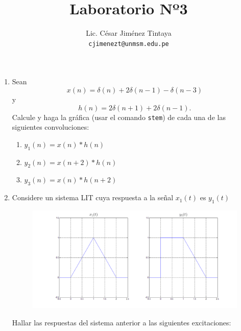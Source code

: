 \documentclass[a4paper,11pt,final]{article}
\begin{document}
    \title{Laboratorio Nº3}
    \author{Lic. César Jiménez Tintaya\\ \small{\texttt{cjimenezt@unmsm.edu.pe}}}
    \date{}
    \maketitle

    \begin{enumerate}
        \item Sean
        $$x\left(n\right) = \delta\left(n\right) + 2\delta\left(n-1\right) - \delta\left(n-3\right)$$
        y
        $$h\left(n\right) = 2\delta\left(n+1\right) + 2\delta\left(n-1\right).$$
        Calcule y haga la gráfica (usar el comando \texttt{stem}) de cada una de las siguientes
        convoluciones:

        \begin{enumerate}
            \item $y_1\left(n\right) = x\left(n\right)*h\left(n\right)$
            \item $y_2\left(n\right) = x\left(n+2\right)*h\left(n\right)$
            \item $y_3\left(n\right) = x\left(n\right)*h\left(n+2\right)$
        \end{enumerate}

        \item Considere un sistema LIT cuya respuesta a la señal $x_1\left(t\right)$ es $y_1\left(t\right)$

        \begin{figure}[H]
            \begin{center}
                \includegraphics[width=1\textwidth]{./lab3prob2a.png}
            \end{center}
        \end{figure}

        Hallar las respuestas del sistema anterior a las siguientes excitaciones:


\end{enumerate}
\end{document}
